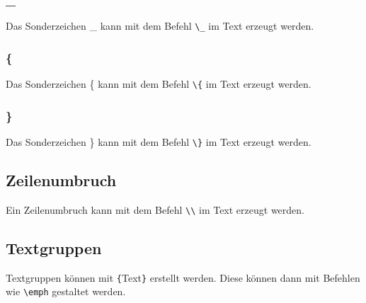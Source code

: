 \documentclass[
12pt,
ngerman
]{scrreprt}
\begin{document}
\subsubsection{\_}
Das Sonderzeichen \_ kann mit dem Befehl \verb!\_! im Text erzeugt werden.
\subsubsection{\{}
Das Sonderzeichen \{ kann mit dem Befehl \verb!\{! im Text erzeugt werden.
\subsubsection{\}}
Das Sonderzeichen \} kann mit dem Befehl \verb!\}! im Text erzeugt werden.
\subsection{Zeilenumbruch}
Ein Zeilenumbruch kann mit dem Befehl \verb!\\! im Text erzeugt werden.
\subsection{Textgruppen}
Textgruppen können mit \verb!{!Text\verb!}! erstellt werden. Diese können dann mit Befehlen wie \verb!\emph! gestaltet werden.
\end{document}
